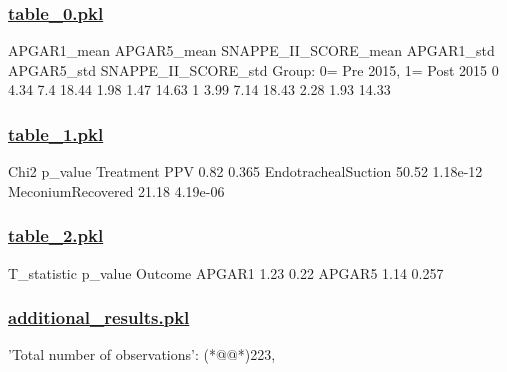 \documentclass[11pt]{article}
\begin{document}
\subsubsection*{\hyperlink{code-Data Analysis-table-0-pkl}{table\_0.pkl}}

\begin{codeoutput}
                                  APGAR1\_mean  APGAR5\_mean  SNAPPE\_II\_SCORE\_mean  APGAR1\_std  APGAR5\_std  SNAPPE\_II\_SCORE\_std
Group: 0= Pre 2015, 1= Post 2015                                                                                             
0                                        4.34          7.4                 18.44        1.98        1.47                14.63
1                                        3.99         7.14                 18.43        2.28        1.93                14.33
\end{codeoutput}\hypertarget{file-table-1-pkl}{}

\subsubsection*{\hyperlink{code-Data Analysis-table-1-pkl}{table\_1.pkl}}

\begin{codeoutput}
                     Chi2   p\_value
Treatment                          
PPV                  0.82     0.365
EndotrachealSuction 50.52  1.18e-12
MeconiumRecovered   21.18  4.19e-06
\end{codeoutput}\hypertarget{file-table-2-pkl}{}

\subsubsection*{\hyperlink{code-Data Analysis-table-2-pkl}{table\_2.pkl}}

\begin{codeoutput}
         T\_statistic p\_value
Outcome                     
APGAR1          1.23    0.22
APGAR5          1.14   0.257
\end{codeoutput}\hypertarget{file-additional-results-pkl}{}

\subsubsection*{\hyperlink{code-Data Analysis-additional-results-pkl}{additional\_results.pkl}}

\begin{codeoutput}
{
    'Total number of observations': (*@@*)223,
}
\end{codeoutput}
\end{document}
